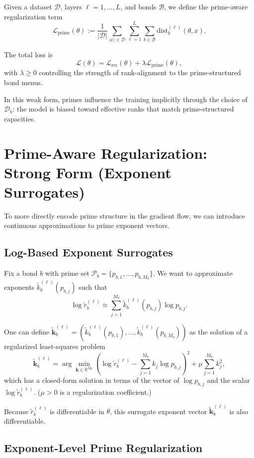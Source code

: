 \documentclass[11pt]{article}
\begin{document}
Given a dataset $\mathcal{D}$, layers $\ell=1,\dots,L$, and bonds $\mathcal{B}$, we define the prime-aware regularization term
\[
\mathcal{L}_{\mathrm{prime}}(\theta)
:= \frac{1}{|\mathcal{D}|}
\sum_{\lvert x \rangle\in \mathcal{D}}
\sum_{\ell=1}^L
\sum_{b\in\mathcal{B}}
\mathrm{dist}_b^{(\ell)}(\theta,x).
\]

The total loss is
\[
\mathcal{L}(\theta)
= \mathcal{L}_{\mathrm{rec}}(\theta)
+ \lambda \mathcal{L}_{\mathrm{prime}}(\theta),
\]
with $\lambda\ge 0$ controlling the strength of rank-alignment to the prime-structured bond menus.

In this weak form, primes influence the training implicitly through the choice of $\mathcal{D}_b$: the model is biased toward effective ranks that match prime-structured capacities.

\section{Prime-Aware Regularization: Strong Form (Exponent Surrogates)}

To more directly encode prime structure in the gradient flow, we can introduce continuous approximations to prime exponent vectors.

\subsection{Log-Based Exponent Surrogates}

Fix a bond $b$ with prime set $\mathcal{P}_b = \{p_{b,1},\dots,p_{b,M_b}\}$. We want to approximate exponents $\tilde{k}_b^{(\ell)}(p_{b,j})$ such that
\[
\log \tilde{r}_b^{(\ell)}
\approx \sum_{j=1}^{M_b} \tilde{k}_b^{(\ell)}(p_{b,j}) \log p_{b,j}.
\]

One can define $\tilde{\mathbf{k}}_b^{(\ell)} = (\tilde{k}_b^{(\ell)}(p_{b,1}),\dots,\tilde{k}_b^{(\ell)}(p_{b,M_b}))$ as the solution of a regularized least-squares problem
\[
\tilde{\mathbf{k}}_b^{(\ell)}
= \arg\min_{\mathbf{k}\in\mathbb{R}^{M_b}}
\left(
\log \tilde{r}_b^{(\ell)} - \sum_{j=1}^{M_b} k_j \log p_{b,j}
\right)^2
+ \mu \sum_{j=1}^{M_b} k_j^2,
\]
which has a closed-form solution in terms of the vector of $\log p_{b,j}$ and the scalar $\log\tilde{r}_b^{(\ell)}$. ($\mu>0$ is a regularization coefficient.)

Because $\tilde{r}_b^{(\ell)}$ is differentiable in $\theta$, this surrogate exponent vector $\tilde{\mathbf{k}}_b^{(\ell)}$ is also differentiable.

\subsection{Exponent-Level Prime Regularization}
\end{document}
